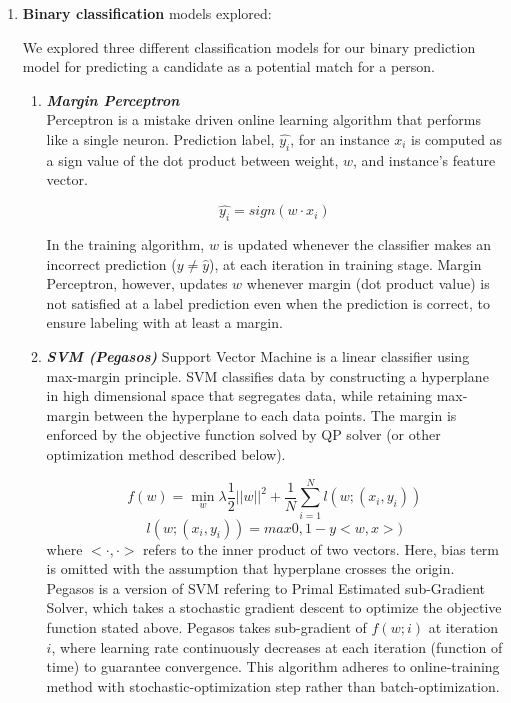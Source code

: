 \documentclass[11pt,letterpaper]{article}
\begin{document}
\begin{enumerate}
\item \textbf{Binary classification} models explored:

We explored three different classification models for our binary prediction model for predicting a candidate as a potential match for a person.

\begin{enumerate}
\item \textbf{\emph{Margin Perceptron}}\\
Perceptron is a mistake driven online learning algorithm that performs like a single neuron. Prediction label, $\hat{y_i}$, for an instance $x_i$ is computed as a sign value of the dot product between weight, $w$, and instance's feature vector.

\begin{equation}
\hat{y_i} = sign(w \cdot x_i)
\end{equation}

In the training algorithm, $w$ is updated whenever the classifier makes an incorrect prediction ($y \neq \hat{y}$), at each iteration in training stage. Margin Perceptron, however, updates $w$ whenever margin (dot product value) is not satisfied at a label prediction even when the prediction is correct, to ensure labeling with at least a margin.

\item \textbf{\emph{SVM (Pegasos)}}
Support Vector Machine is a linear classifier using max-margin principle.
SVM classifies data by constructing a hyperplane in high dimensional space that segregates data, while retaining max-margin between the hyperplane to each data points. The margin is enforced by the objective function solved by QP solver (or other optimization method described below).

\begin{equation}
f(w) = \min_w \lambda \frac{1}{2}||w||^2 + \frac{1}{N}\sum_{i=1}^N l(w;(x_i,y_i))
\end{equation}
\begin{equation}
l(w;(x_i,y_i)) = max{0, 1 - y<w,x>)}
\end{equation}
where $<\cdot, \cdot>$ refers to the inner product of two vectors. Here, bias term is omitted with the assumption that hyperplane crosses the origin.\\

Pegasos is a version of SVM refering to Primal Estimated sub-Gradient Solver, which takes a stochastic gradient descent to optimize the objective function stated above. Pegasos takes sub-gradient of $f(w;i)$ at iteration $i$, where learning rate continuously decreases at each iteration (function of time) to guarantee convergence. This algorithm adheres to online-training method with stochastic-optimization step rather than batch-optimization.\\


\end{enumerate}
\end{enumerate}
\end{document}
